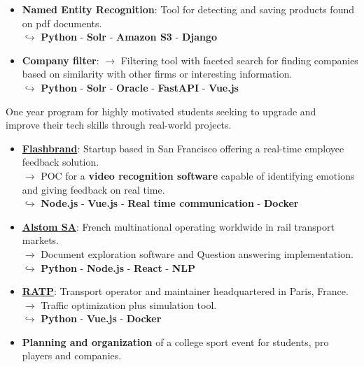 \documentclass[9pt,a4paper,ragged2e]{altacv}
\begin{document}
\smallskip
\begin{itemize}
  \item \textbf{Named Entity Recognition}: Tool for detecting and saving products found on pdf documents.\\
  $\hookrightarrow$ \textbf{Python} - \textbf{Solr} - \textbf{Amazon S3} - \textbf{Django}
  \item \textbf{Company filter}: 
  $\rightarrow$ Filtering tool with faceted search for finding companies based on similarity with other firms or interesting information.\\
  $\hookrightarrow$ \textbf{Python} - \textbf{Solr} - \textbf{Oracle} - \textbf{FastAPI} - \textbf{Vue.js}
\end{itemize}
\divider
{}
One year program for highly motivated students seeking to upgrade and \\improve their tech skills through real-world projects.
\smallskip
\begin{itemize}
	\item \href{https://flashbrand.me/}{\textbf{Flashbrand}}: Startup based in San Francisco offering a real-time employee feedback solution. \\$\rightarrow$ POC for a \textbf{video recognition software} capable of identifying emotions and giving feedback on real time. \\
    $\hookrightarrow$ \textbf{Node.js} - \textbf{Vue.js} - \textbf{Real time communication} - \textbf{Docker}
  \item \href{https://www.alstom.com/}{\textbf{Alstom SA}}: French multinational operating worldwide in rail transport \\markets.\\
  $\rightarrow$ Document exploration software and Question answering implementation.\\
  $\hookrightarrow$ \textbf{Python} - \textbf{Node.js} - \textbf{React} - \textbf{NLP}
  \item \href{https://www.ratp.fr/}{\textbf{RATP}}: Transport operator and maintainer headquartered in Paris, France.\\
  $\rightarrow$ Traffic optimization plus simulation tool.\\
  $\hookrightarrow$ \textbf{Python} - \textbf{Vue.js} - \textbf{Docker}
\end{itemize}
\divider
{}
\begin{itemize}
	\item \textbf{Planning and organization} of a college sport event for students, pro players and companies.
\end{itemize}
\end{document}
